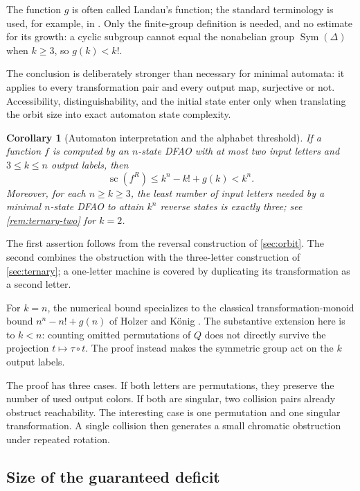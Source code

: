 \documentclass[11pt,a4paper]{article}
\numberwithin{equation}{section}
\newtheorem{corollary}[theorem]{Corollary}
\theoremstyle{definition}
\theoremstyle{remark}
\newcommand{\D}{\Delta}
\newcommand{\Sym}{\operatorname{Sym}}
\newcommand{\statecomplex}{\operatorname{sc}}
\begin{document}
The function $g$ is often called Landau's function; the standard terminology
is used, for example, in \cite{landau}. Only the finite-group definition is
needed, and no estimate for its growth: a cyclic subgroup cannot equal the
nonabelian group $\Sym(\D)$ when $k\ge3$, so $g(k)<k!$.

The conclusion is deliberately stronger than necessary for minimal automata:
it applies to every transformation pair and every output map, surjective or
not. Accessibility, distinguishability, and the initial state enter only when
translating the orbit size into exact automaton state complexity.

\begin{corollary}[Automaton interpretation and the alphabet
threshold]\label{cor:sc}
If a function $f$ is computed by an $n$-state DFAO with at most two input
letters and $3\le k\le n$ output labels, then
\[
 \statecomplex(f^R)\le k^n-k!+g(k)<k^n.
\]
Moreover, for each $n\ge k\ge3$, the least number of input letters needed by
a minimal $n$-state DFAO to attain $k^n$ reverse states is exactly three; see
\cref{rem:ternary-two} for $k=2$.
\end{corollary}

The first assertion follows from the reversal construction of
\cref{sec:orbit}. The second combines the obstruction with the three-letter
construction of \cref{sec:ternary}; a one-letter machine is covered by
duplicating its transformation as a second letter.

For $k=n$, the numerical bound specializes to the classical
transformation-monoid bound $n^n-n!+g(n)$ of Holzer and K\"onig
\cite[Theorem~13]{HolzerKoenig2004}. The substantive extension here is to
$k<n$: counting omitted permutations of $Q$ does not directly survive the
projection $t\mapsto\tau\circ t$. The proof instead makes the symmetric
group act on the $k$ output labels.

The proof has three cases. If both letters are permutations, they preserve
the number of used output colors. If both are singular, two collision pairs
already obstruct reachability. The interesting case is one permutation and
one singular transformation. A single collision then generates a small
chromatic obstruction under repeated rotation.

\subsection{Size of the guaranteed deficit}\label{sec:deficitsize}
\end{document}
